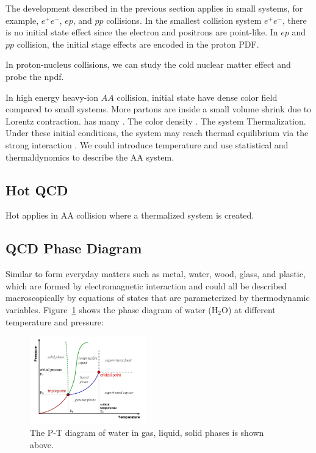 The development described in the previous section applies in small systems, for example, $e^+ e^-$, $ep$, and $pp$ collisions. In the smallest collision system $e^+e^-$, there is no initial state effect since the electron and positrons are point-like. In $ep$ and $pp$ collision, the initial stage effects are encoded in the proton PDF. 

In proton-nucleus collisions, we can study the cold nuclear matter effect and probe the npdf.  

In high energy heavy-ion $AA$ collision, initial state have dense color field compared to small systems. More partons are inside a small volume shrink due to Lorentz contraction.  has many . The color density . The system   Thermalization. Under these initial conditions, the system may reach thermal equilibrium via the strong interaction \cite{QCDThemDyn}. We could introduce temperature and use statistical and thermaldynomics to describe the AA system.

\subsection{Hot QCD} 

Hot applies in AA collision where a thermalized system is created. 

\subsection{QCD Phase Diagram}

Similar to form everyday matters such as metal, water, wood, glass, and plastic, which are formed by electromagnetic interaction and could all be described macroscopically by equations of states that are parameterized by thermodynamic variables. Figure~\ref{QEDPhaseDiagram} shows the phase diagram of water ($\mathrm{H_2O}$) at different temperature and pressure:

\begin{figure}[hbtp]
\begin{center}
\includegraphics[width=0.45\textwidth]{Figures/Chapter1/WaterPhaseDiagram.png}
\caption{The P-T diagram of water in gas, liquid, solid phases is shown above.}
\label{QEDPhaseDiagram}
\end{center}
\end{figure} 


